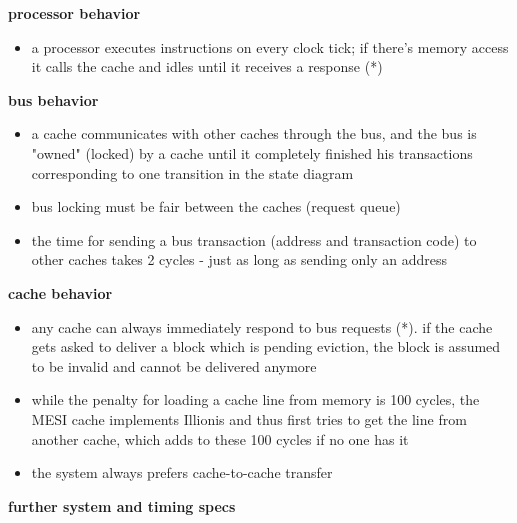 \documentclass{article}
\begin{document}
\begin{multicols}{2}

\textbf{processor behavior}

\begin{itemize}
    \item a processor executes instructions on every clock tick; if there's memory access it calls the cache and idles until it receives a response (*)
\end{itemize}

\textbf{bus behavior}

\begin{itemize}
    \item a cache communicates with other caches through the bus, and the bus is "owned" (locked) by a cache until it completely finished his transactions corresponding to one transition in the state diagram
    \item bus locking must be fair between the caches (request queue)
    \item the time for sending a bus transaction (address and transaction code) to other caches takes 2 cycles - just as long as sending only an address
\end{itemize}

\textbf{cache behavior}

\begin{itemize}
    \item any cache can always immediately respond to bus requests (*). if the cache gets asked to deliver a block which is pending eviction, the block is assumed to be invalid and cannot be delivered anymore
    \item while the penalty for loading a cache line from memory is 100 cycles, the MESI cache implements Illionis and thus first tries to get the line from another cache, which adds to these 100 cycles if no one has it
    \item the system always prefers cache-to-cache transfer
\end{itemize}

\textbf{further system and timing specs}


\end{multicols}
\end{document}
